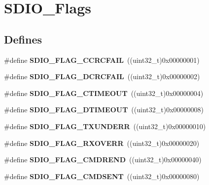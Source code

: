 \hypertarget{group__SDIO__Flags}{
\section{SDIO\_\-Flags}
\label{group__SDIO__Flags}
}
\subsection*{Defines}
\begin{DoxyCompactItemize}
\item 
\hypertarget{group__SDIO__Flags_ga8ff1f3960378e05ec3c949940e1c49d0}{
\#define {\bfseries SDIO\_\-FLAG\_\-CCRCFAIL}~((uint32\_\-t)0x00000001)}
\label{group__SDIO__Flags_ga8ff1f3960378e05ec3c949940e1c49d0}

\item 
\hypertarget{group__SDIO__Flags_ga6de936ea11cbc79444d519268ad9f9bd}{
\#define {\bfseries SDIO\_\-FLAG\_\-DCRCFAIL}~((uint32\_\-t)0x00000002)}
\label{group__SDIO__Flags_ga6de936ea11cbc79444d519268ad9f9bd}

\item 
\hypertarget{group__SDIO__Flags_ga7389f64ff6cfa4f459bf852b5faede30}{
\#define {\bfseries SDIO\_\-FLAG\_\-CTIMEOUT}~((uint32\_\-t)0x00000004)}
\label{group__SDIO__Flags_ga7389f64ff6cfa4f459bf852b5faede30}

\item 
\hypertarget{group__SDIO__Flags_ga2d2fd219dd9fea522862195ab9568345}{
\#define {\bfseries SDIO\_\-FLAG\_\-DTIMEOUT}~((uint32\_\-t)0x00000008)}
\label{group__SDIO__Flags_ga2d2fd219dd9fea522862195ab9568345}

\item 
\hypertarget{group__SDIO__Flags_gabd18f8e5d5387a38dccbe1bf28ae5dbc}{
\#define {\bfseries SDIO\_\-FLAG\_\-TXUNDERR}~((uint32\_\-t)0x00000010)}
\label{group__SDIO__Flags_gabd18f8e5d5387a38dccbe1bf28ae5dbc}

\item 
\hypertarget{group__SDIO__Flags_gad49d60039e40d31b734cfacf90caa84f}{
\#define {\bfseries SDIO\_\-FLAG\_\-RXOVERR}~((uint32\_\-t)0x00000020)}
\label{group__SDIO__Flags_gad49d60039e40d31b734cfacf90caa84f}

\item 
\hypertarget{group__SDIO__Flags_ga083531db75a1e4c05c47578763d53af1}{
\#define {\bfseries SDIO\_\-FLAG\_\-CMDREND}~((uint32\_\-t)0x00000040)}
\label{group__SDIO__Flags_ga083531db75a1e4c05c47578763d53af1}

\item 
\hypertarget{group__SDIO__Flags_gac81f3837aac17a6aed7310a8ea460f17}{
\#define {\bfseries SDIO\_\-FLAG\_\-CMDSENT}~((uint32\_\-t)0x00000080)}
\label{group__SDIO__Flags_gac81f3837aac17a6aed7310a8ea460f17}


\end{DoxyCompactItemize}
